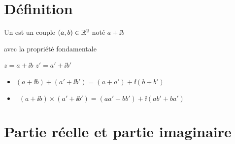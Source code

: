 \section{Définition}

\begin{frame}
  Un  est un couple $(a, b) \in \mathbb{R}^2$
  noté $a + \ii b$

\pause


avec la propriété fondamentale

\pause



\pause

\qquad $z = a + \ii b$ \qquad $z' = a' + \ii b'$
\begin{itemize}
  \item {} \quad  $(a + \ii b) + (a' + \ii b') =
(a + a') + \ii  (b + b')$
\pause \pause
  \item {} \  $(a + \ii b) \times (a' + \ii b')
  = (aa' - bb') + \ii  (ab' + ba')$
\end{itemize}
\end{frame}


\section{Partie réelle et partie imaginaire}

